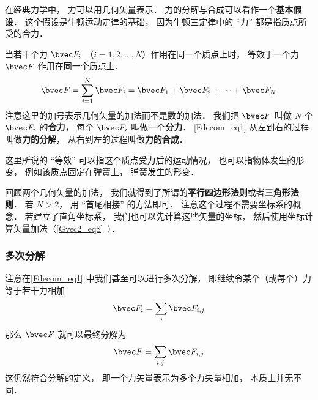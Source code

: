 

在经典力学中， 力可以用几何矢量表示． 力的分解与合成可以看作一个\textbf{基本假设}． 这个假设是牛顿运动定律的基础， 因为牛顿三定律中的 “力” 都是指质点所受的合力．

当若干个力 $\bvec F_i$ （$i = 1, 2, \dots, N$）作用在同一个质点上时， 等效于一个力 $\bvec F$ 作用在同一个质点上．
\begin{equation}\label{Fdecom_eq1}
\bvec F = \sum_{i=1}^N \bvec F_i = \bvec F_1 + \bvec F_2 + \dots + \bvec F_N
\end{equation}
注意这里的加号表示几何矢量的加法而不是数的加法． 我们把 $\bvec F$ 叫做 $N$ 个 $\bvec F_i$ 的\textbf{合力}， 每个 $\bvec F_i$ 叫做一个\textbf{分力}． \autoref{Fdecom_eq1} 从左到右的过程叫做\textbf{力的分解}， 从右到左的过程叫做\textbf{力的合成}．

这里所说的 “等效” 可以指这个质点受力后的运动情况， 也可以指物体发生的形变， 例如该质点固定在弹簧上， 弹簧发生的形变．

回顾两个几何矢量的加法， 我们就得到了所谓的\textbf{平行四边形法则}或者\textbf{三角形法则}． 若 $N > 2$， 用 “首尾相接” 的方法即可． 注意这个过程不需要坐标系的概念． 若建立了直角坐标系， 我们也可以先计算这些矢量的坐标， 然后使用坐标计算矢量加法（\autoref{Gvec2_eq8}~）．

\subsubsection{多次分解}
注意在\autoref{Fdecom_eq1} 中我们甚至可以进行多次分解， 即继续令某个（或每个）力等于若干力相加
\begin{equation}
\bvec F_i = \sum_j \bvec F_{i,j}
\end{equation}
那么 $\bvec F$ 就可以最终分解为
\begin{equation}
\bvec F = \sum_{i,j} \bvec F_{i,j}
\end{equation}
这仍然符合分解的定义， 即一个力矢量表示为多个力矢量相加， 本质上并无不同．

